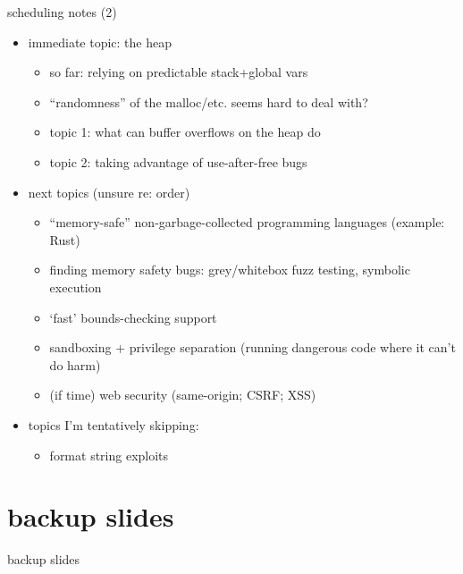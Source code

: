 \begin{frame}{scheduling notes (2)}
    \begin{itemize}
    \item immediate topic: the heap
        \begin{itemize}
        \item so far: relying on predictable stack+global vars
        \item ``randomness'' of the malloc/etc. seems hard to deal with?
        \item topic 1: what can buffer overflows on the heap do
        \item topic 2: taking advantage of use-after-free bugs
        \end{itemize}
    \item next topics (unsure re: order)
        \begin{itemize}
        \item ``memory-safe'' non-garbage-collected programming languages (example: Rust)
        \item finding memory safety bugs: grey/whitebox fuzz testing, symbolic execution
        \item `fast' bounds-checking support
        \item sandboxing + privilege separation (running dangerous code where it can't do harm)
        \item (if time) web security (same-origin; CSRF; XSS)
        \end{itemize}
    \item topics I'm tentatively skipping:
        \begin{itemize}
        \item format string exploits
        \end{itemize}
    \end{itemize}
\end{frame}

 




\section{backup slides}
\begin{frame}{backup slides}
\end{frame}


